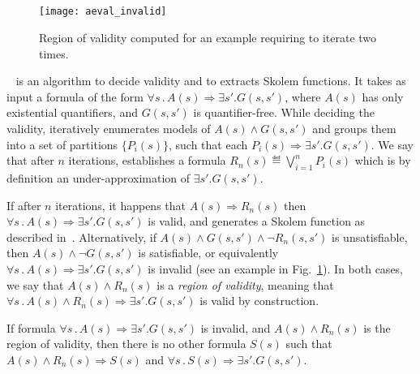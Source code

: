 \subsection{\aeval}
\label{sec:aeval}

\begin{figure}[!t]
\centering
\texttt{[image: aeval\_invalid]}
\caption{Region of validity computed for an example requiring \aeval to iterate two times.}
\label{fg:aeval}
\end{figure}

\aeval~\cite{fedyukovich2015automated} is an algorithm to decide validity and to extracts Skolem functions.
It takes as input a formula of the form $\forall s \,.\,  A(s) \Rightarrow \exists s' . G(s,s')$, 
where $A(s)$ has only existential quantifiers, and $G(s,s')$ is quantifier-free.
%
While deciding the validity, \aeval iteratively enumerates models of $A(s) \land G (s, s')$ and groups them into a set of partitions $\{P_i(s)\}$, such that each $P_i(s) \Rightarrow \exists s' . G (s, s')$.
We say that after $n$ iterations, \aeval establishes a formula $R_n(s) \eqdef \bigvee_{i=1}^n P_i(s)$ which is by definition an under-approximation of $\exists s' . G (s, s')$.

If after $n$ iterations, it happens that $A(s) \Rightarrow R_n(s)$ then $\forall s \,.\,  A(s) \Rightarrow \exists s' . G(s,s')$ is valid, and \aeval generates a Skolem function as described in~\cite{katis2016synthesis}.
Alternatively, if $A(s) \land  G (s, s') \land \neg{R_n (s, s')}$ is unsatisfiable, then $A(s) \land \neg G (s, s')$ is satisfiable, or equivalently $\forall s \,.\,  A(s) \Rightarrow \exists s' . G(s,s')$ is invalid (see an example in Fig.~\ref{fg:aeval}).
In both cases, we say that $A(s) \land R_n(s)$ is a \emph{region of validity}, meaning that $\forall s \,.\,  A(s) \land R_n(s) \Rightarrow \exists s' . G(s,s')$ is valid by construction.

\begin{lemma}
If formula $\forall s \,.\,  A(s) \Rightarrow \exists s' . G(s,s')$ is invalid, and $A(s) \land R_n(s)$ is the region of validity, then there is no other formula $S(s)$ such that $A(s) \land R_n(s) \Rightarrow S(s)$ and $\forall s \,.\,  S(s) \Rightarrow \exists s' . G(s,s')$.

\label{lem:subset}
\end{lemma}
